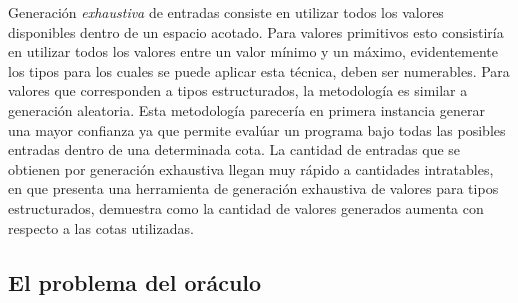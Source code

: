 Generaci\'on \emph{exhaustiva} de entradas consiste en utilizar todos los valores disponibles dentro de un espacio acotado. Para valores primitivos esto consistir\'ia en utilizar todos los valores entre un valor m\'inimo y un m\'aximo, evidentemente los tipos para los cuales se puede aplicar esta t\'ecnica, deben ser numerables. Para valores que corresponden a tipos estructurados, la metodolog\'ia es similar a generaci\'on aleatoria. Esta metodolog\'ia parecer\'ia en primera instancia generar una mayor confianza ya que permite eval\'uar un programa bajo todas las posibles entradas dentro de una determinada cota. La cantidad de entradas que se obtienen por generaci\'on exhaustiva llegan muy r\'apido a cantidades intratables, en \cite{bibliography.testing.generation.KoratBoyapatiKM02} que presenta una herramienta de generaci\'on exhaustiva de valores para tipos estructurados, demuestra como la cantidad de valores generados aumenta con respecto a las cotas utilizadas.


\subsection{El problema del or\'aculo}


